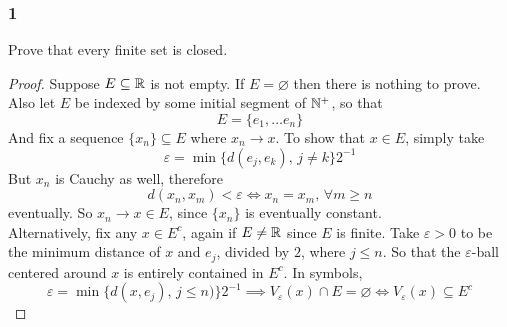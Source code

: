 \documentclass[../main.tex]{subfiles}
\begin{document}
\providecommand{\xn}{\{x_n\}}
\subsubsection*{1}
\begin{wts}
    Prove that every finite set is closed.
\end{wts}
\begin{proof}
    Suppose $E\subseteq\mathbb{R}$ is not empty. If $E=\varnothing$ then there is nothing to prove. Also let $E$ be indexed by some initial segment of $\mathbb{N}^+$, so that
    \[E=\{e_1,\ldots e_n\}\]And fix a sequence $\xn\subseteq E$ where $x_n\to x$. To show that $x\in E$, simply take 
    \[\varepsilon = \min\{d(e_j,e_k),\,j\neq k\}2^{-1}\]
    But $x_n$ is Cauchy as well, therefore 
    \[d(x_n,x_m)<\varepsilon\iff x_n = x_m,\,\forall m\geq n\]
    eventually. So $x_n\to x\in E$, since $\xn$ is eventually constant. \\
    
    Alternatively, fix any $x\in E^c$, again if $E \neq \mathbb{R}$ since $E$ is finite. Take $\varepsilon>0$ to be the minimum distance of $x$ and $e_j$, divided by $2$, where $j\leq n$. So that the $\varepsilon$-ball centered around $x$ is entirely contained in $E^c$. In symbols,
    \[\varepsilon=\min\{d(x,e_j),\,j\leq n)\}2^{-1}\implies V_{\varepsilon}(x)\cap E=\varnothing\iff V_\varepsilon(x)\subseteq E^c\]
\end{proof}
\end{document}
